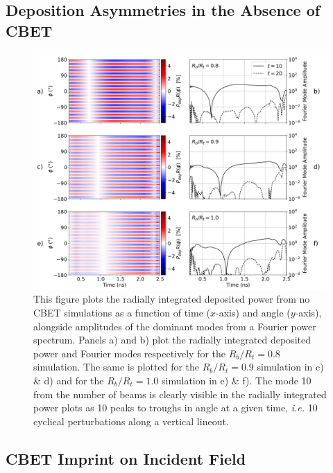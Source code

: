 \subsection{Deposition Asymmetries in the Absence of CBET}%
\label{sec:Res1_noCBET_asymmetries}

\begin{figure}[t!]
    \includegraphics[width=\linewidth]{Results1/Images/noCBET_PR_modes.png}
    \centering
    \caption{This figure plots the radially integrated deposited power from no \ac{CBET} simulations as a function of time ($x$-axis) and angle ($y$-axis), alongside amplitudes of the dominant modes from a Fourier power spectrum.
    Panels a) and b) plot the radially integrated deposited power and Fourier modes respectively for the $R_b/R_t=0.8$ simulation.
    The same is plotted for the $R_b/R_t=0.9$ simulation in c) \& d) and for the $R_b/R_t=1.0$ simulation in e) \& f).
    The mode 10 from the number of beams is clearly visible in the radially integrated power plots as 10 peaks to troughs in angle at a given time, \textit{i.e.} 10 cyclical perturbations along a vertical lineout.}%
    \label{fig:Res1_PR_noCBET_modes}
\end{figure}


\subsection{CBET Imprint on Incident Field}%
\label{sec:Res1_CBET_imprint}

